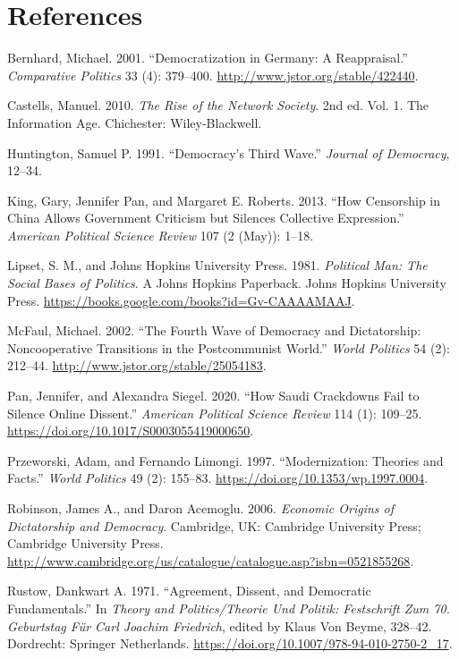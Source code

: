 \documentclass[12pt,]{article}
\begin{document}
\hypertarget{references}{%
\section*{References}\label{references}}

\hypertarget{refs}{}
\leavevmode\hypertarget{ref-bernhard}{}%
Bernhard, Michael. 2001. ``Democratization in Germany: A Reappraisal.''
\emph{Comparative Politics} 33 (4): 379--400.
\url{http://www.jstor.org/stable/422440}.

\leavevmode\hypertarget{ref-castells}{}%
Castells, Manuel. 2010. \emph{The Rise of the Network Society}. 2nd ed.
Vol. 1. The Information Age. Chichester: Wiley-Blackwell.

\leavevmode\hypertarget{ref-huntington}{}%
Huntington, Samuel P. 1991. ``Democracy's Third Wave.'' \emph{Journal of
Democracy}, 12--34.

\leavevmode\hypertarget{ref-king}{}%
King, Gary, Jennifer Pan, and Margaret E. Roberts. 2013. ``How
Censorship in China Allows Government Criticism but Silences Collective
Expression.'' \emph{American Political Science Review} 107 (2 (May)):
1--18.

\leavevmode\hypertarget{ref-lipset}{}%
Lipset, S. M., and Johns Hopkins University Press. 1981. \emph{Political
Man: The Social Bases of Politics}. A Johns Hopkins Paperback. Johns
Hopkins University Press.
\url{https://books.google.com/books?id=Gv-CAAAAMAAJ}.

\leavevmode\hypertarget{ref-mcfaul}{}%
McFaul, Michael. 2002. ``The Fourth Wave of Democracy and Dictatorship:
Noncooperative Transitions in the Postcommunist World.'' \emph{World
Politics} 54 (2): 212--44. \url{http://www.jstor.org/stable/25054183}.

\leavevmode\hypertarget{ref-pan2020}{}%
Pan, Jennifer, and Alexandra Siegel. 2020. ``How Saudi Crackdowns Fail
to Silence Online Dissent.'' \emph{American Political Science Review}
114 (1): 109--25. \url{https://doi.org/10.1017/S0003055419000650}.

\leavevmode\hypertarget{ref-przeworski}{}%
Przeworski, Adam, and Fernando Limongi. 1997. ``Modernization: Theories
and Facts.'' \emph{World Politics} 49 (2): 155--83.
\url{https://doi.org/10.1353/wp.1997.0004}.

\leavevmode\hypertarget{ref-robinson}{}%
Robinson, James A., and Daron Acemoglu. 2006. \emph{Economic Origins of
Dictatorship and Democracy}. Cambridge, UK: Cambridge University Press;
Cambridge University Press.
\url{http://www.cambridge.org/us/catalogue/catalogue.asp?isbn=0521855268}.

\leavevmode\hypertarget{ref-rustow}{}%
Rustow, Dankwart A. 1971. ``Agreement, Dissent, and Democratic
Fundamentals.'' In \emph{Theory and Politics/Theorie Und Politik:
Festschrift Zum 70. Geburtstag Für Carl Joachim Friedrich}, edited by
Klaus Von Beyme, 328--42. Dordrecht: Springer Netherlands.
\url{https://doi.org/10.1007/978-94-010-2750-2_17}.





\newpage
\singlespacing 
\end{document}
